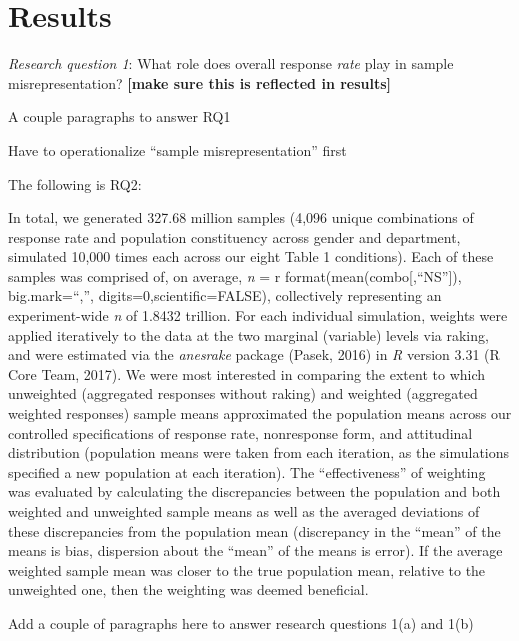 \documentclass[
  man,floatsintext]{apa7}
\begin{document}
\hypertarget{results}{%
\section{Results}\label{results}}

\emph{Research question 1}: What role does overall response \emph{rate} play in sample misrepresentation? \textbf{{[}make sure this is reflected in results{]}}

A couple paragraphs to answer RQ1

Have to operationalize ``sample misrepresentation'' first

The following is RQ2:

In total, we generated 327.68 million samples (4,096 unique combinations of response rate and population constituency across gender and department, simulated 10,000 times each across our eight Table 1 conditions). Each of these samples was comprised of, on average, \emph{n} = r format(mean(combo{[},``NS''{]}), big.mark=``,'', digits=0,scientific=FALSE), collectively representing an experiment-wide \emph{n} of 1.8432 trillion. For each individual simulation, weights were applied iteratively to the data at the two marginal (variable) levels via raking, and were estimated via the \emph{anesrake} package (Pasek, 2016) in \emph{R} version 3.31 (R Core Team, 2017). We were most interested in comparing the extent to which unweighted (aggregated responses without raking) and weighted (aggregated weighted responses) sample means approximated the population means across our controlled specifications of response rate, nonresponse form, and attitudinal distribution (population means were taken from each iteration, as the simulations specified a new population at each iteration). The ``effectiveness'' of weighting was evaluated by calculating the discrepancies between the population and both weighted and unweighted sample means as well as the averaged deviations of these discrepancies from the population mean (discrepancy in the ``mean'' of the means is bias, dispersion about the ``mean'' of the means is error). If the average weighted sample mean was closer to the true population mean, relative to the unweighted one, then the weighting was deemed beneficial.

Add a couple of paragraphs here to answer research questions 1(a) and 1(b)
\end{document}
